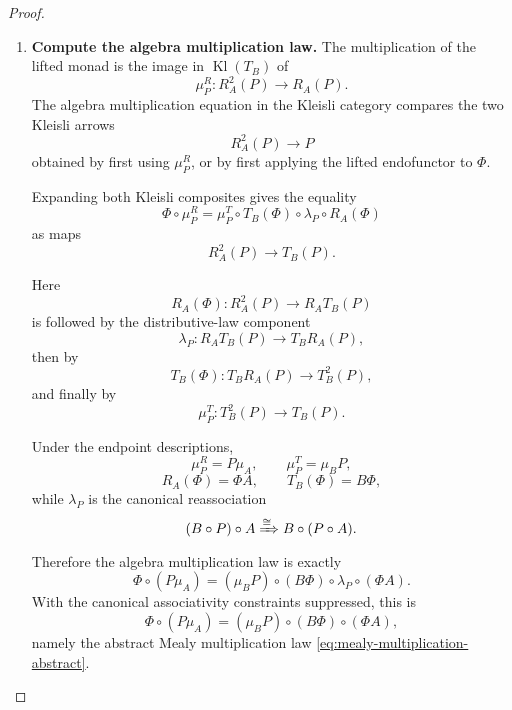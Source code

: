 \begin{proof}
\begin{enumerate}
        The algebra unit equation in \(\operatorname{Kl}(T_B)\) says that the
        Kleisli composite of this arrow with \(\Phi\) is the identity Kleisli
        arrow on \(P\). Expanding Kleisli composition and using the unit laws
        of \(T_B\), this equation reduces to
        \[
            \Phi\circ\eta^R_P
            =
            \eta^T_P
        \]
        as maps
        \[
            P\to T_B(P).
        \]

        Under the endpoint descriptions of the two monads,
        \[
            \eta^R_P=P\eta_A,
            \qquad
            \eta^T_P=\eta_B P.
        \]
        Hence the algebra unit law is exactly
        \[
            \Phi\circ(P\eta_A)
            =
            \eta_B P,
        \]
        which is the abstract Mealy unit law
        \eqref{eq:mealy-unit-abstract}.

        \item \textbf{Compute the algebra multiplication law.}
        The multiplication of the lifted monad is the image in
        \(\operatorname{Kl}(T_B)\) of
        \[
            \mu^R_P:
            R_A^2(P)\to R_A(P).
        \]
        The algebra multiplication equation in the Kleisli category compares
        the two Kleisli arrows
        \[
            R_A^2(P)\to P
        \]
        obtained by first using \(\mu^R_P\), or by first applying the lifted
        endofunctor to \(\Phi\).

        Expanding both Kleisli composites gives the equality
        \[
            \Phi\circ\mu^R_P
            =
            \mu^T_P\circ
            T_B(\Phi)\circ
            \lambda_P\circ
            R_A(\Phi)
        \]
        as maps
        \[
            R_A^2(P)\to T_B(P).
        \]

        Here
        \[
            R_A(\Phi):
            R_A^2(P)\to R_AT_B(P)
        \]
        is followed by the distributive-law component
        \[
            \lambda_P:
            R_AT_B(P)\to T_BR_A(P),
        \]
        then by
        \[
            T_B(\Phi):
            T_BR_A(P)\to T_B^2(P),
        \]
        and finally by
        \[
            \mu^T_P:
            T_B^2(P)\to T_B(P).
        \]

        Under the endpoint descriptions,
        \[
            \mu^R_P=P\mu_A,
            \qquad
            \mu^T_P=\mu_B P,
        \]
        \[
            R_A(\Phi)=\Phi A,
            \qquad
            T_B(\Phi)=B\Phi,
        \]
        while \(\lambda_P\) is the canonical reassociation
        \[
            (B\circ P)\circ A
            \xRightarrow{\cong}
            B\circ(P\circ A).
        \]
        Therefore the algebra multiplication law is exactly
        \[
            \Phi\circ(P\mu_A)
            =
            (\mu_B P)\circ
            (B\Phi)\circ
            \lambda_P\circ
            (\Phi A).
        \]
        With the canonical associativity constraints suppressed, this is
        \[
            \Phi\circ(P\mu_A)
            =
            (\mu_B P)\circ(B\Phi)\circ(\Phi A),
        \]
        namely the abstract Mealy multiplication law
        \eqref{eq:mealy-multiplication-abstract}.


\end{enumerate}
\end{proof}

